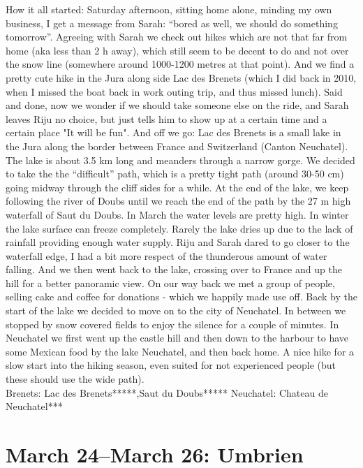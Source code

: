 How it all started: Saturday afternoon, sitting home alone, minding my own business, I get a message from Sarah: ``bored as well, we should do something tomorrow''. Agreeing with Sarah we check out hikes which are not that far from home (aka less than 2 h away), which still seem to be decent to do and not over the snow line (somewhere around 1000-1200 metres at that point). And we find a pretty cute hike in the Jura along side Lac des Brenets (which I did back in 2010, when I missed the boat back in work outing trip, and thus missed lunch). Said and done, now we wonder if we should take someone else on the ride, and Sarah leaves Riju no choice, but just tells him to show up at a certain time and a certain place "It will be fun". And off we go: Lac des Brenets is a small lake in the Jura along the border between France and Switzerland (Canton Neuchatel). The lake is about 3.5 km long and meanders through a narrow gorge. We decided to take the the ``difficult'' path, which is a pretty tight path (around 30-50 cm) going midway through the cliff sides for a while. At the end of the lake, we keep following the river of Doubs until we reach the end of the path by the 27 m high waterfall of Saut du Doubs. In March the water levels are pretty high. In winter the lake surface can freeze completely. Rarely the lake dries up due to the lack of rainfall providing enough water supply. Riju and Sarah dared to go closer to the waterfall edge, I had a bit more respect of the thunderous amount of water falling. And we then went back to the lake, crossing over to France and up the hill for a better panoramic view. On our way back we met a group of people, selling cake and coffee for donations - which we happily made use off. Back by the start of the lake we decided to move on to the city of Neuchatel. In between we stopped by snow covered fields to enjoy the silence for a couple of minutes. In Neuchatel we first went up the castle hill and then down to the harbour to have some Mexican food by the lake Neuchatel, and then back home. A nice hike for a slow start into the hiking season, even suited for not experienced people (but these should use the wide path).\\

Brenets: Lac des Brenets*****,Saut du Doubs*****
Neuchatel: Chateau de Neuchatel***\\

\section{March 24--March 26: Umbrien}
\label{2017:Umbria}

